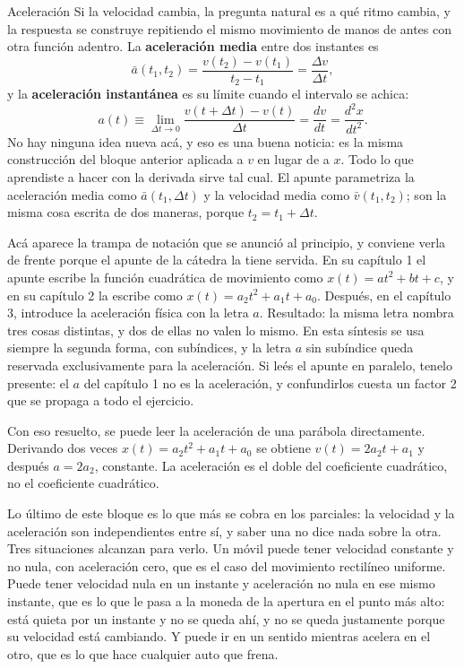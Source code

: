 \documentclass[11pt,openany]{book}
\begin{document}
\begin{bloque}{Aceleración}
Si la velocidad cambia, la pregunta natural es a qué ritmo cambia, y la respuesta se construye repitiendo el mismo movimiento de manos de antes con otra función adentro. La \textbf{aceleración media} entre dos instantes es
\[
\bar a(t_1,t_2) = \frac{v(t_2)-v(t_1)}{t_2-t_1} = \frac{\Delta v}{\Delta t},
\]
y la \textbf{aceleración instantánea} es su límite cuando el intervalo se achica:
\[
a(t) \equiv \lim_{\Delta t\to 0}\frac{v(t+\Delta t)-v(t)}{\Delta t} = \frac{dv}{dt} = \frac{d^2x}{dt^2}.
\]
No hay ninguna idea nueva acá, y eso es una buena noticia: es la misma construcción del bloque anterior aplicada a $v$ en lugar de a $x$. Todo lo que aprendiste a hacer con la derivada sirve tal cual. El apunte parametriza la aceleración media como $\bar a(t_1,\Delta t)$ y la velocidad media como $\bar v(t_1,t_2)$; son la misma cosa escrita de dos maneras, porque $t_2 = t_1 + \Delta t$.

Acá aparece la trampa de notación que se anunció al principio, y conviene verla de frente porque el apunte de la cátedra la tiene servida. En su capítulo 1 el apunte escribe la función cuadrática de movimiento como $x(t)=at^2+bt+c$, y en su capítulo 2 la escribe como $x(t)=a_2t^2+a_1t+a_0$. Después, en el capítulo 3, introduce la aceleración física con la letra $a$. Resultado: la misma letra nombra tres cosas distintas, y dos de ellas no valen lo mismo. En esta síntesis se usa siempre la segunda forma, con subíndices, y la letra $a$ sin subíndice queda reservada exclusivamente para la aceleración. Si leés el apunte en paralelo, tenelo presente: el $a$ del capítulo 1 no es la aceleración, y confundirlos cuesta un factor 2 que se propaga a todo el ejercicio.

Con eso resuelto, se puede leer la aceleración de una parábola directamente. Derivando dos veces $x(t)=a_2t^2+a_1t+a_0$ se obtiene $v(t) = 2a_2t + a_1$ y después $a = 2a_2$, constante. La aceleración es el doble del coeficiente cuadrático, no el coeficiente cuadrático.

Lo último de este bloque es lo que más se cobra en los parciales: la velocidad y la aceleración son independientes entre sí, y saber una no dice nada sobre la otra. Tres situaciones alcanzan para verlo. Un móvil puede tener velocidad constante y no nula, con aceleración cero, que es el caso del movimiento rectilíneo uniforme. Puede tener velocidad nula en un instante y aceleración no nula en ese mismo instante, que es lo que le pasa a la moneda de la apertura en el punto más alto: está quieta por un instante y no se queda ahí, y no se queda justamente porque su velocidad está cambiando. Y puede ir en un sentido mientras acelera en el otro, que es lo que hace cualquier auto que frena.


\end{bloque}
\end{document}
